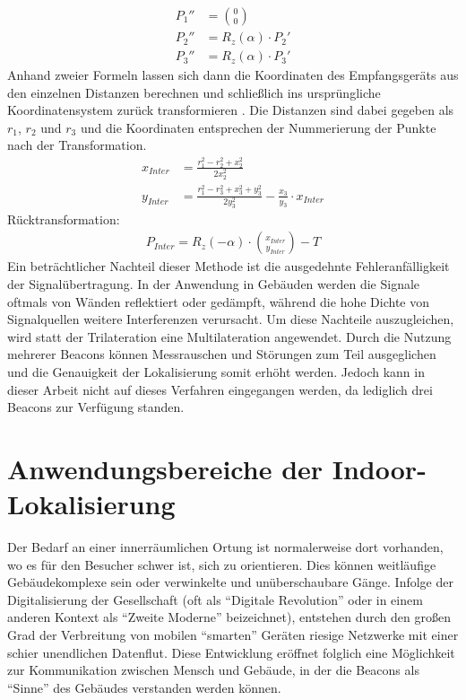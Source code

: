 \begin{align*}
P_1'' &= \binom{0}{0}\\
P_2'' &= R_z\left ( \alpha \right ) \cdot P_2'\\
P_3'' &= R_z\left ( \alpha \right ) \cdot P_3'
\end{align*}
Anhand zweier Formeln lassen sich dann die Koordinaten des Empfangsgeräts aus den einzelnen Distanzen berechnen und schließlich ins ursprüngliche Koordinatensystem zurück transformieren \cite{Trilat}. Die Distanzen sind dabei gegeben als $r_1$, $r_2$ und $r_3$ und die Koordinaten entsprechen der Nummerierung der Punkte nach der Transformation.
\begin{align*}
x_{Inter} &= \frac{r_1^2-r_2^2+x_2^2}{2x_2^2}\\
y_{Inter} &= \frac{r_1^2-r_3^2+x_3^2+y_3^2}{2y_3^2}-\frac{x_3}{y_3}\cdot x_{Inter}
\end{align*}
Rücktransformation:
\begin{align*}
P_{Inter} = R_z\left ( -\alpha \right ) \cdot \binom{x_{Inter}}{y_{Inter}} - T
\end{align*}
Ein beträchtlicher Nachteil dieser Methode ist die ausgedehnte Fehleranfälligkeit der Signalübertragung. In der Anwendung in Gebäuden werden die Signale oftmals von Wänden reflektiert oder gedämpft, während die hohe Dichte von Signalquellen weitere Interferenzen verursacht. Um diese Nachteile auszugleichen, wird statt der Trilateration eine Multilateration angewendet. Durch die Nutzung mehrerer Beacons können Messrauschen und Störungen zum Teil ausgeglichen und die Genauigkeit der Lokalisierung somit erhöht werden. Jedoch kann in dieser Arbeit nicht auf dieses Verfahren eingegangen werden, da lediglich drei Beacons zur Verfügung standen. 
\section{Anwendungsbereiche der Indoor-Lokalisierung}
Der Bedarf an einer innerräumlichen Ortung ist normalerweise dort vorhanden, wo es für den Besucher schwer ist, sich zu orientieren. Dies können weitläufige Gebäudekomplexe sein oder verwinkelte und unüberschaubare Gänge. Infolge der Digitalisierung der Gesellschaft (oft als "`Digitale Revolution"' oder in einem anderen Kontext als "`Zweite Moderne"' \cite{DigRev} beizeichnet), entstehen durch den großen Grad der Verbreitung von mobilen "`smarten"' Geräten riesige Netzwerke mit einer schier unendlichen Datenflut. Diese Entwicklung eröffnet folglich eine Möglichkeit zur Kommunikation zwischen Mensch und Gebäude, in der die Beacons als "`Sinne"' des Gebäudes verstanden werden können.  
